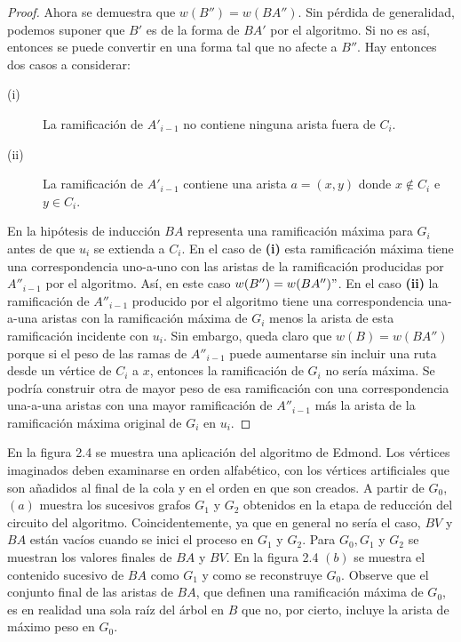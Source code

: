 \documentclass[10pt,a5paper]{book}
\begin{document}
\begin{proof}
Ahora se demuestra que $w(B'') = w(BA'')$. Sin pérdida de generalidad, podemos suponer que $B'$ es de la forma de $BA'$ por el algoritmo. Si no es así, entonces se puede convertir en una forma tal que no afecte a $B''$. Hay entonces dos casos a considerar:
\begin{description}
\item[(i)] La ramificación de $A'_{i-1}$ no contiene ninguna arista fuera de $C_i$.
\item[(ii)] La ramificación de $A'_{i-1}$ contiene una arista $a= (x,y)$ donde $x \notin C_i$ e $y \in C_i$.
\end{description}

En la hipótesis de inducción $BA$ representa una ramificación máxima para $G_i$ antes de que $u_i$ se extienda a $C_i$. En el caso de \textbf{(i)} esta ramificación máxima tiene una correspondencia uno-a-uno con las aristas de la ramificación producidas por $A''_{i-1}$ por el algoritmo. Así, en este caso $w(B'') = w(BA'')"$. En el caso \textbf{(ii)} la ramificación de $A''_{i-1}$ producido por el algoritmo tiene una correspondencia una-a-una aristas con la ramificación máxima de $G_i$ menos la arista de esta ramificación incidente con $u_i$. Sin embargo, queda claro que $w(B) = w(BA'')$ porque si el peso de las ramas de $A''_{i-1}$ puede aumentarse sin incluir una ruta desde un vértice de $C_i$ a $x$, entonces la ramificación de $G_i$ no sería máxima. Se podría construir otra de mayor peso de esa ramificación con una correspondencia una-a-una aristas con una mayor ramificación de $A''_{i-1}$ más la arista de la ramificación máxima original de $G_i$ en $u_i$.
\end{proof}

En la figura 2.4 se muestra una aplicación del algoritmo de Edmond. Los vértices imaginados deben examinarse en orden alfabético, con los vértices artificiales que son añadidos al final de la cola y en el orden en que son creados. A partir de $G_0$, $(a)$ muestra los sucesivos grafos $G_1$ y $G_2$ obtenidos en la etapa de reducción del circuito del algoritmo. Coincidentemente, ya que en general no sería el caso, $BV$ y $BA$ están vacíos cuando se inici el proceso en $G_1$ y $G_2$. Para $G_0, G_1$ y $G_2$ se muestran los valores finales de $BA$ y $BV$. En la figura 2.4 $(b)$ se muestra el contenido sucesivo de $BA$ como $G_1$ y como se reconstruye $G_0$. Observe que el conjunto final de las aristas de $BA$, que definen una ramificación máxima de $G_0$, es en realidad una sola raíz del árbol en $B$ que no, por cierto, incluye la arista de máximo peso en $G_0$.
\end{document}
